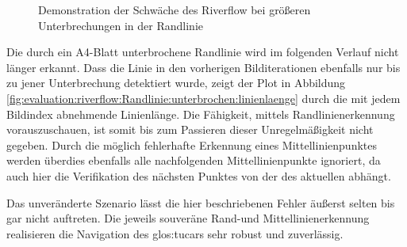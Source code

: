 \begin{figure}[htbp] %
	\hfill
	\caption{Demonstration der Schwäche des Riverflow bei größeren Unterbrechungen in der Randlinie}
	\label{fig:evaluation:riverflow:Randlinie:unterbrochen}
\end{figure}

Die durch ein A4-Blatt unterbrochene Randlinie wird im folgenden Verlauf nicht länger erkannt. Dass die Linie in den vorherigen Bilditerationen ebenfalls nur bis zu jener Unterbrechung detektiert wurde, zeigt der Plot in Abbildung \ref{fig:evaluation:riverflow:Randlinie:unterbrochen:linienlaenge} durch die mit jedem Bildindex abnehmende Linienlänge. Die Fähigkeit, mittels Randlinienerkennung vorauszuschauen, ist somit bis zum Passieren dieser Unregelmäßigkeit nicht gegeben. Durch die möglich fehlerhafte Erkennung eines Mittellinienpunktes werden überdies ebenfalls alle nachfolgenden Mittellinienpunkte ignoriert, da auch hier die Verifikation des nächsten Punktes von der des aktuellen abhängt. 

Das unveränderte Szenario lässt die hier beschriebenen Fehler äußerst selten bis gar nicht auftreten. Die jeweils souveräne Rand-und Mittellinienerkennung realisieren die Navigation des \gls{glos:tucar}s sehr robust und zuverlässig. 

